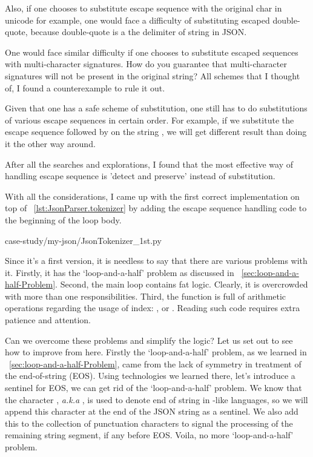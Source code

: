 Also, if one chooses to substitute escape sequence with the original char in unicode for example,
one would face a difficulty of substituting escaped double-quote,
because double-quote is a the delimiter of string in JSON\@.

One would face similar difficulty if one chooses to substitute escaped sequences with
multi-character signatures.
How do you guarantee that multi-character signatures will not be present in the original string?
All schemes that I thought of, I found a counterexample to rule it out.

Given that one has a safe scheme of substitution, one still has to do substitutions of
various escape sequences in certain order.
For example, if we substitute the escape sequence 
followed by  on the string ,
we will get different result than doing it the other way around.

After all the searches and explorations, I found that
the most effective way of handling escape sequence is 'detect and preserve'
instead of substitution.

With all the considerations, I came up with the first correct implementation on top of
~\autoref{lst:JsonParser.tokenizer} by adding the escape sequence handling code to the beginning of
the loop body.

{case-study/my-json/JsonTokenizer_1st.py}

Since it's a first version, it is needless to say that there are various problems with it.
Firstly, it has the `loop-and-a-half' problem as discussed in
~\autoref{sec:loop-and-a-half-Problem}.
Second, the main loop contains fat logic.
Clearly, it is overcrowded with more than one responsibilities.
Third, the function is full of arithmetic operations regarding the usage of index:
,  or .
Reading such code requires extra patience and attention.

Can we overcome these problems and simplify the logic?
Let us set out to see how to improve from here.
Firstly the `loop-and-a-half' problem, as we learned in ~\autoref{sec:loop-and-a-half-Problem},
came from the lack of symmetry in treatment of the end-of-string (EOS).
Using technologies we learned there, let's introduce a sentinel for EOS,
we can get rid of the `loop-and-a-half' problem.
We know that the character , \textit{a.k.a} ,
is used to denote end of string in -like languages,
so we will append this character at the end of the JSON string as a sentinel.
We also add this to the collection of punctuation characters to signal the processing of the
remaining string segment, if any before EOS\@.
Voila, no more `loop-and-a-half' problem.

